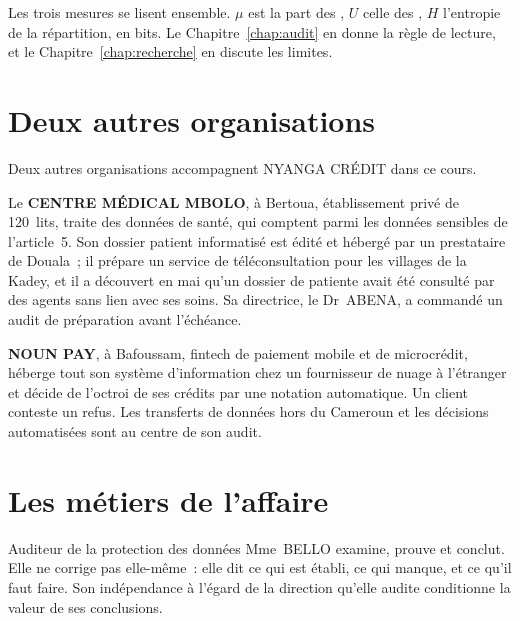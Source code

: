 Les trois mesures se lisent ensemble. $\mu$ est la part des \OUI{}, $U$
celle des \NEK{}, $H$ l'entropie de la répartition, en bits. Le
Chapitre~\ref{chap:audit} en donne la règle de lecture, et le
Chapitre~\ref{chap:recherche} en discute les limites.

\section{Deux autres organisations}
\label{sec:p00-autres}

Deux autres organisations accompagnent NYANGA CRÉDIT dans ce cours.

Le \textbf{CENTRE MÉDICAL MBOLO}, à Bertoua, établissement privé de
120~lits, traite des données de santé, qui comptent parmi les données
sensibles de l'article~5. Son dossier patient informatisé est édité et
hébergé par un prestataire de Douala~; il prépare un service de
téléconsultation pour les villages de la Kadey, et il a découvert en mai
qu'un dossier de patiente avait été consulté par des agents sans lien avec
ses soins. Sa directrice, le Dr~ABENA, a commandé un audit de préparation
avant l'échéance.

\textbf{NOUN PAY}, à Bafoussam, fintech de paiement mobile et de
microcrédit, héberge tout son système d'information chez un fournisseur de
nuage à l'étranger et décide de l'octroi de ses crédits par une notation
automatique. Un client conteste un refus. Les transferts de données hors du
Cameroun et les décisions automatisées sont au centre de son audit.

\section{Les métiers de l'affaire}
\label{sec:p00-metiers}

\begin{boxmetier}{Auditeur de la protection des données}
Mme~BELLO examine, prouve et conclut. Elle ne corrige pas elle-même~: elle
dit ce qui est établi, ce qui manque, et ce qu'il faut faire. Son
indépendance à l'égard de la direction qu'elle audite conditionne la valeur
de ses conclusions.
\end{boxmetier}

